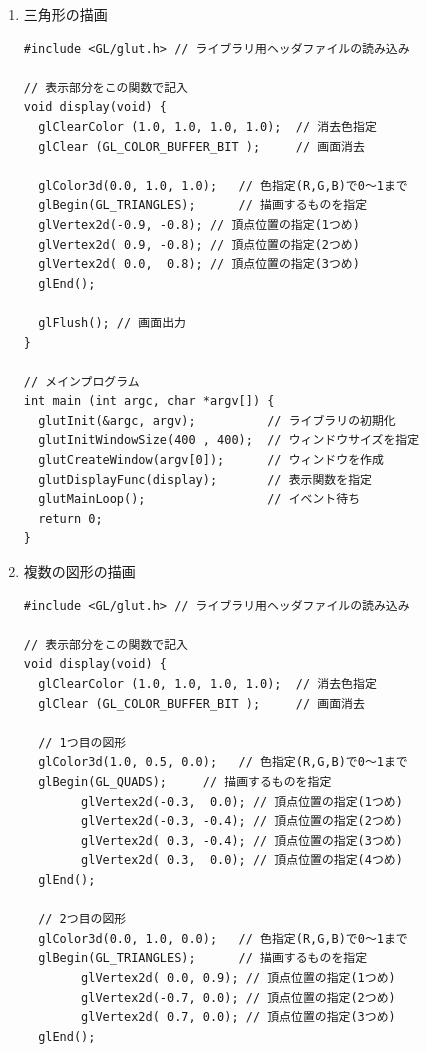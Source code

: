 \documentclass{scrartcl}
\begin{document}
\begin{enumerate}
\item 三角形の描画\\

\begin{verbatim}
#include <GL/glut.h> // ライブラリ用ヘッダファイルの読み込み

// 表示部分をこの関数で記入
void display(void) {        
  glClearColor (1.0, 1.0, 1.0, 1.0);  // 消去色指定
  glClear (GL_COLOR_BUFFER_BIT );     // 画面消去

  glColor3d(0.0, 1.0, 1.0);   // 色指定(R,G,B)で0～1まで
  glBegin(GL_TRIANGLES);      // 描画するものを指定
  glVertex2d(-0.9, -0.8); // 頂点位置の指定(1つめ)
  glVertex2d( 0.9, -0.8); // 頂点位置の指定(2つめ)
  glVertex2d( 0.0,  0.8); // 頂点位置の指定(3つめ) 
  glEnd();                               

  glFlush(); // 画面出力
}

// メインプログラム
int main (int argc, char *argv[]) { 
  glutInit(&argc, argv);          // ライブラリの初期化
  glutInitWindowSize(400 , 400);  // ウィンドウサイズを指定
  glutCreateWindow(argv[0]);      // ウィンドウを作成
  glutDisplayFunc(display);       // 表示関数を指定
  glutMainLoop();                 // イベント待ち
  return 0;
}
\end{verbatim}

\item 複数の図形の描画\\

\begin{verbatim}
#include <GL/glut.h> // ライブラリ用ヘッダファイルの読み込み

// 表示部分をこの関数で記入
void display(void) {        
  glClearColor (1.0, 1.0, 1.0, 1.0);  // 消去色指定
  glClear (GL_COLOR_BUFFER_BIT );     // 画面消去

  // 1つ目の図形
  glColor3d(1.0, 0.5, 0.0);   // 色指定(R,G,B)で0～1まで
  glBegin(GL_QUADS);     // 描画するものを指定
        glVertex2d(-0.3,  0.0); // 頂点位置の指定(1つめ)
        glVertex2d(-0.3, -0.4); // 頂点位置の指定(2つめ)
        glVertex2d( 0.3, -0.4); // 頂点位置の指定(3つめ) 
        glVertex2d( 0.3,  0.0); // 頂点位置の指定(4つめ) 
  glEnd();                               

  // 2つ目の図形
  glColor3d(0.0, 1.0, 0.0);   // 色指定(R,G,B)で0～1まで
  glBegin(GL_TRIANGLES);      // 描画するものを指定
        glVertex2d( 0.0, 0.9); // 頂点位置の指定(1つめ)
        glVertex2d(-0.7, 0.0); // 頂点位置の指定(2つめ)
        glVertex2d( 0.7, 0.0); // 頂点位置の指定(3つめ) 
  glEnd();                               


\end{verbatim}
\end{enumerate}
\end{document}

